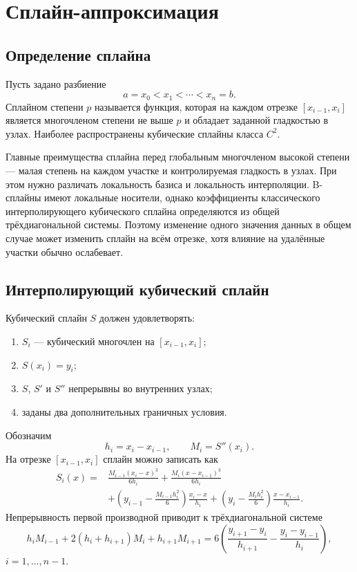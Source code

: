 \section{Сплайн-аппроксимация}
\label{sec:spline-approximation}

\subsection{Определение сплайна}

Пусть задано разбиение
\[
    a=x_0<x_1<\cdots<x_n=b.
\]
Сплайном степени $p$ называется функция, которая на каждом отрезке
$[x_{i-1},x_i]$ является многочленом степени не выше $p$ и обладает заданной
гладкостью в узлах. Наиболее распространены кубические сплайны класса $C^2$.

Главные преимущества сплайна перед глобальным многочленом высокой степени ---
малая степень на каждом участке и контролируемая гладкость в узлах. При этом
нужно различать локальность базиса и локальность интерполяции. B-сплайны имеют
локальные носители, однако коэффициенты классического интерполирующего кубического
сплайна определяются из общей трёхдиагональной системы. Поэтому изменение одного
значения данных в общем случае может изменить сплайн на всём отрезке, хотя влияние
на удалённые участки обычно ослабевает.

\subsection{Интерполирующий кубический сплайн}

Кубический сплайн $S$ должен удовлетворять:
\begin{enumerate}
    \item $S_i$ --- кубический многочлен на $[x_{i-1},x_i]$;
    \item $S(x_i)=y_i$;
    \item $S$, $S'$ и $S''$ непрерывны во внутренних узлах;
    \item заданы два дополнительных граничных условия.
\end{enumerate}

Обозначим
\[
    h_i=x_i-x_{i-1},
    \qquad
    M_i=S''(x_i).
\]
На отрезке $[x_{i-1},x_i]$ сплайн можно записать как
\[
\begin{aligned}
S_i(x)=&
\frac{M_{i-1}(x_i-x)^3}{6h_i}
+\frac{M_i(x-x_{i-1})^3}{6h_i}\\
&+\left(y_{i-1}-\frac{M_{i-1}h_i^2}{6}\right)
  \frac{x_i-x}{h_i}
+\left(y_i-\frac{M_i h_i^2}{6}\right)
  \frac{x-x_{i-1}}{h_i}.
\end{aligned}
\]
Непрерывность первой производной приводит к трёхдиагональной системе
\[
    h_iM_{i-1}+2(h_i+h_{i+1})M_i+h_{i+1}M_{i+1}
    =
    6\left(
    \frac{y_{i+1}-y_i}{h_{i+1}}
    -\frac{y_i-y_{i-1}}{h_i}
    \right),
\]
$i=1,\ldots,n-1$.

